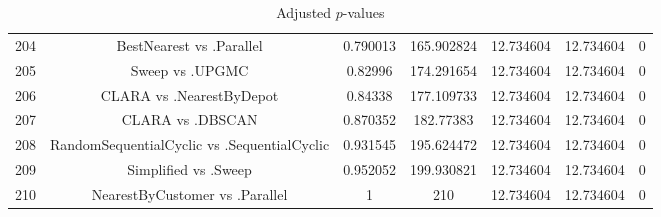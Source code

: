 \documentclass[a4paper,10pt]{article}
\begin{document}
\begin{landscape}
\begin{table}[!htp]
\begin{tabular}{ccccccc}
204&BestNearest vs .Parallel&0.790013&165.902824&12.734604&12.734604&0\\
205&Sweep vs .UPGMC&0.82996&174.291654&12.734604&12.734604&0\\
206&CLARA vs .NearestByDepot&0.84338&177.109733&12.734604&12.734604&0\\
207&CLARA vs .DBSCAN&0.870352&182.77383&12.734604&12.734604&0\\
208&RandomSequentialCyclic vs .SequentialCyclic&0.931545&195.624472&12.734604&12.734604&0\\
209&Simplified vs .Sweep&0.952052&199.930821&12.734604&12.734604&0\\
210&NearestByCustomer vs .Parallel&1&210&12.734604&12.734604&0\\
\hline
\end{tabular}
\caption{Adjusted $p$-values}
\end{table}

\end{landscape}
\end{document}
